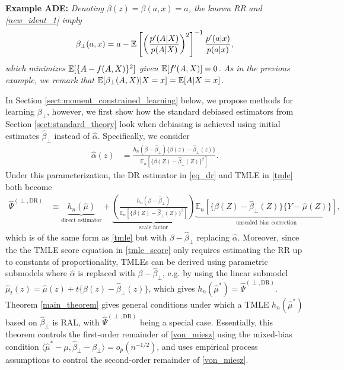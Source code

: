 \textbf{Example ADE:} \textit{
Denoting $\beta(z) = \beta(a,x) = a$, the known RR and \eqref{new_ident_1} imply
\begin{align*}
    \beta_\perp(a,x) = a - \mathbb{E}\left[\left(\frac{p^\prime(A|X)}{p(A|X)} \right)^2 \right]^{-1} \frac{p^\prime(a|x)}{p(a|x)},
\end{align*}
which minimizes $\mathbb{E}[\{A - f(A,X)\}^2]$ given $\mathbb{E}[f^\prime(A, X)] = 0$. As in the previous example, we remark that $\mathbb{E}[\beta_\perp(A,X)|X=x] = \mathbb{E}[A|X=x]$.
}

In Section \ref{sect:moment_constrained_learning} below, we propose methods for learning $\beta_\perp$, however, we first show how the standard debiased estimators from Section \ref{sect:standard_theory} look when debiasing is achieved using initial estimates $\hat{\beta}_\perp$ instead of $\hat{\alpha}$. Specifically, we consider
\begin{align*}
    \hat{\alpha}(z) &= \frac{h_n(\beta-\hat{\beta}_\perp) \{\beta(z) - \hat{\beta}_\perp(z)\} }{ \mathbb{E}_n [\{\beta(Z) - \hat{\beta}_\perp(Z)\}^2] }. %
\end{align*}
Under this parameterization, the DR
estimator in \eqref{eq_dr} and TMLE in \eqref{tmle} both become
\begin{align}
\hat{\Psi}^{(\perp, \text{DR})} &\equiv \underbrace{h_n(\hat{\mu})}_{\text{direct estimator}} + \underbrace{ \left(\frac{h_n(\beta-\hat{\beta}_\perp)}{\mathbb{E}_n [\{\beta(Z) - \hat{\beta}_\perp(Z)\}^2]} \right)}_{\text{scale factor}} \underbrace{ \mathbb{E}_n [\{\beta(Z) - \hat{\beta}_\perp(Z)\}\{Y - \hat{\mu}(Z)\}] }_{\text{unscaled bias correction}},
\end{align}
which is of the same form as \eqref{tmle} but with $\beta - \hat{\beta}_\perp$ replacing $\hat{\alpha}$. Moreover, since the the TMLE score equation in \eqref{tmle_score} only requires estimating the RR up to constants of proportionality, TMLEs can be derived using parametric submodels where $\hat{\alpha}$ is replaced with $\beta - \hat{\beta}_\perp$, e.g. by using the linear submodel $\hat{\mu}_t(z) = \hat{\mu}(z) + t \{\beta(z) - \hat{\beta}_\perp(z)\}$, which gives $h_n(\hat{\mu}^*) = \hat{\Psi}^{(\perp, \text{DR})}$. Theorem \ref{main_theorem} gives general conditions under which a TMLE $h_n(\hat{\mu}^*)$ based on $\hat{\beta}_\perp$ is RAL, with $\hat{\Psi}^{(\perp, \text{DR})}$ being a special case. Essentially, this theorem controls the first-order remainder of \eqref{von_miesz} using the mixed-bias condition $\langle \hat{\mu}^* - \mu , \hat{\beta}_{\perp}  - \beta_\perp\rangle = o_p(n^{-1/2})$, and uses empirical process assumptions to control the second-order remainder of \eqref{von_miesz}.

